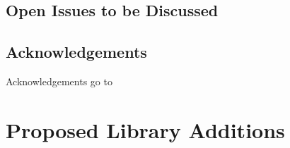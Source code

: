 \documentclass[ebook,11pt,article]{memoir}
\begin{document}
\section{Open Issues to be Discussed}

\section{Acknowledgements}
Acknowledgements go to 

\chapter{Proposed Library Additions}
%
%




\end{document}
